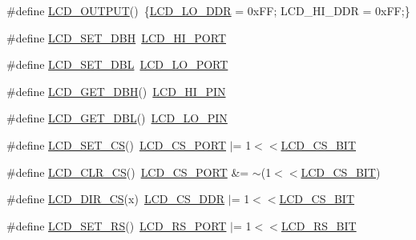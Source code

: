 \begin{DoxyCompactItemize}
\item 
\#define \hyperlink{group___s_s_d1289_ga64f863f4d2271cd895466b70d0e1a707}{L\+C\+D\+\_\+\+O\+U\+T\+P\+U\+T}()~\{\hyperlink{group___s_s_d1289_ga80fe94799cc97d53850ad19fbc65040c}{L\+C\+D\+\_\+\+L\+O\+\_\+\+D\+D\+R} = 0x\+F\+F; L\+C\+D\+\_\+\+H\+I\+\_\+\+D\+D\+R = 0x\+F\+F;\}
\item 
\#define \hyperlink{group___s_s_d1289_ga19d9c5ec8ab2353e82472cedc4cbf525}{L\+C\+D\+\_\+\+S\+E\+T\+\_\+\+D\+B\+H}~\hyperlink{group___s_s_d1289_ga3aa31ee91966a5fdc3048f9349cf05d5}{L\+C\+D\+\_\+\+H\+I\+\_\+\+P\+O\+R\+T}
\item 
\#define \hyperlink{group___s_s_d1289_gaf033747ebb38e451abc95932a3972687}{L\+C\+D\+\_\+\+S\+E\+T\+\_\+\+D\+B\+L}~\hyperlink{group___s_s_d1289_ga732d0a6d1e03ae0c4e01aa46a1566b69}{L\+C\+D\+\_\+\+L\+O\+\_\+\+P\+O\+R\+T}
\item 
\#define \hyperlink{group___s_s_d1289_ga03a8e49d0eb484b721644a583874fa84}{L\+C\+D\+\_\+\+G\+E\+T\+\_\+\+D\+B\+H}()~\hyperlink{group___s_s_d1289_ga92296ab5dc25ebb81e697ff1af769a2d}{L\+C\+D\+\_\+\+H\+I\+\_\+\+P\+I\+N}
\item 
\#define \hyperlink{group___s_s_d1289_ga844ba43d1fef4b4c77da258183f1fdd5}{L\+C\+D\+\_\+\+G\+E\+T\+\_\+\+D\+B\+L}()~\hyperlink{group___s_s_d1289_ga667e166d29800b8c1c1f2a80440025b7}{L\+C\+D\+\_\+\+L\+O\+\_\+\+P\+I\+N}
\item 
\#define \hyperlink{group___s_s_d1289_ga7b714f419c61528e58aa73dd30adf685}{L\+C\+D\+\_\+\+S\+E\+T\+\_\+\+C\+S}()~\hyperlink{group___s_s_d1289_ga786e250780c1500731386381212e5dbb}{L\+C\+D\+\_\+\+C\+S\+\_\+\+P\+O\+R\+T}  $\vert$=   1$<$$<$\hyperlink{group___s_s_d1289_gae74dd9ee1a6476a863ff736596c07be2}{L\+C\+D\+\_\+\+C\+S\+\_\+\+B\+I\+T}
\item 
\#define \hyperlink{group___s_s_d1289_ga25b2db201cb7be1d672b66a4e0222eba}{L\+C\+D\+\_\+\+C\+L\+R\+\_\+\+C\+S}()~\hyperlink{group___s_s_d1289_ga786e250780c1500731386381212e5dbb}{L\+C\+D\+\_\+\+C\+S\+\_\+\+P\+O\+R\+T}  \&= $\sim$(1$<$$<$\hyperlink{group___s_s_d1289_gae74dd9ee1a6476a863ff736596c07be2}{L\+C\+D\+\_\+\+C\+S\+\_\+\+B\+I\+T})
\item 
\#define \hyperlink{group___s_s_d1289_ga9f8b8833a42d6d0a5011bbc2415d9768}{L\+C\+D\+\_\+\+D\+I\+R\+\_\+\+C\+S}(x)~\hyperlink{group___s_s_d1289_ga2be6e09a7508bf23c288bfa9c8970ad4}{L\+C\+D\+\_\+\+C\+S\+\_\+\+D\+D\+R}   $\vert$=   1$<$$<$\hyperlink{group___s_s_d1289_gae74dd9ee1a6476a863ff736596c07be2}{L\+C\+D\+\_\+\+C\+S\+\_\+\+B\+I\+T}
\item 
\#define \hyperlink{group___s_s_d1289_ga03da94944577db7617d3ed803ef9f3e3}{L\+C\+D\+\_\+\+S\+E\+T\+\_\+\+R\+S}()~\hyperlink{group___s_s_d1289_gac5be2a22727fd9ca349e1c9bcbfbcd47}{L\+C\+D\+\_\+\+R\+S\+\_\+\+P\+O\+R\+T}  $\vert$=   1$<$$<$\hyperlink{group___s_s_d1289_ga3ee95e3ef0c627f4e703afeb1dac335a}{L\+C\+D\+\_\+\+R\+S\+\_\+\+B\+I\+T}

\end{DoxyCompactItemize}
